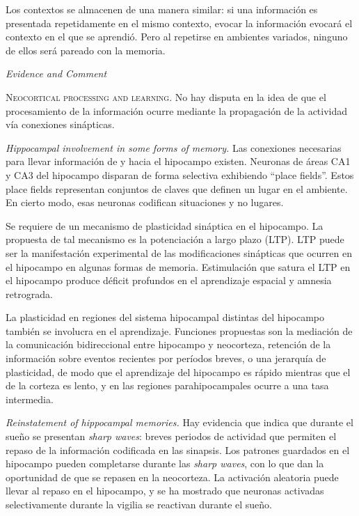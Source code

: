 \documentclass[a4paper,12pt]{article}
\begin{document}
Los contextos se almacenen de una manera similar: si una información es presentada repetidamente en el mismo contexto, evocar la información evocará el contexto en el que se aprendió. Pero al repetirse en ambientes variados, ninguno de ellos será pareado con la memoria.

{\itshape Evidence and Comment}

{\scshape Neocortical processing and learning.} No hay disputa en la idea de que el procesamiento de la información ocurre mediante la propagación de la actividad vía conexiones sinápticas. 

{\itshape Hippocampal involvement in some forms of memory.} Las conexiones necesarias para llevar información de y hacia el hipocampo existen. Neuronas de áreas CA1 y CA3 del hipocampo disparan de forma selectiva exhibiendo ``place fields''. Estos place fields representan conjuntos de claves que definen un lugar en el ambiente. En cierto modo, esas neuronas codifican situaciones y no lugares.

Se requiere de un mecanismo de plasticidad sináptica en el hipocampo. La propuesta de tal mecanismo es la potenciación a largo plazo (LTP). LTP puede ser la manifestación experimental de las modificaciones sinápticas que ocurren en el hipocampo en algunas formas de memoria. Estimulación que satura el LTP en el hipocampo produce déficit profundos en el aprendizaje espacial y amnesia retrograda. 

La plasticidad en regiones del sistema hipocampal distintas del  hipocampo también se involucra en el aprendizaje. Funciones propuestas son la mediación de la comunicación bidireccional entre hipocampo y neocorteza, retención de la información sobre eventos recientes por períodos breves, o una jerarquía de plasticidad, de modo que el aprendizaje del hipocampo es rápido mientras que el de la corteza es lento, y en las regiones parahipocampales ocurre a una tasa intermedia.

{\itshape Reinstatement of hippocampal memories.} Hay evidencia que indica que durante el sueño se presentan {\itshape sharp waves}: breves periodos de actividad que permiten el repaso de la información codificada en las sinapsis. Los patrones guardados en el hipocampo pueden completarse durante las {\itshape sharp waves}, con lo que dan la oportunidad de que se repasen en la neocorteza. La activación aleatoria puede llevar al repaso en el hipocampo, y se ha mostrado que neuronas activadas selectivamente durante la vigilia se reactivan durante el sueño.
\end{document}
